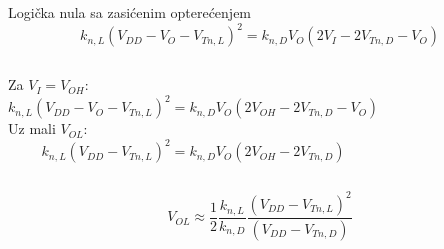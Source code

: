 \begin{frame}[label=09_1-s055]{Logička nula sa zasićenim opterećenjem}\setlength{\parskip}{2pt}\setlength{\abovedisplayskip}{4pt}\setlength{\belowdisplayskip}{4pt}\setlength{\abovedisplayshortskip}{3pt}\setlength{\belowdisplayshortskip}{3pt}
\[k_{n,L}(V_{DD}-V_O-V_{Tn,L})^2=k_{n,D}V_O(2V_I-2V_{Tn,D}-V_O)\]
\begin{columns}[T,onlytextwidth]Za $V_I=V_{OH}$:\[k_{n,L}(V_{DD}-V_O-V_{Tn,L})^2=k_{n,D}V_O(2V_{OH}-2V_{Tn,D}-V_O)\]
Uz mali $V_{OL}$:\[k_{n,L}(V_{DD}-V_{Tn,L})^2=k_{n,D}V_O(2V_{OH}-2V_{Tn,D})\]
\centering \end{columns}\[V_{OL}\approx\frac12\frac{k_{n,L}}{k_{n,D}}\frac{(V_{DD}-V_{Tn,L})^2}{(V_{DD}-V_{Tn,D})}\]

\end{frame}
